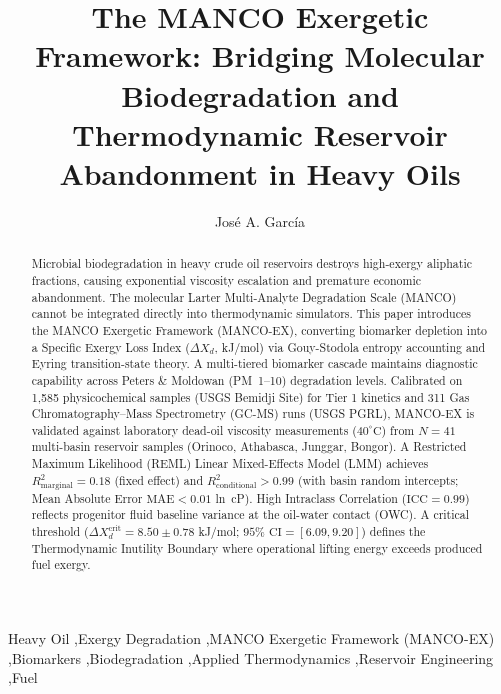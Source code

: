 \documentclass[review,12pt]{elsarticle}
\begin{document}
\begin{frontmatter}

\title{The MANCO Exergetic Framework: Bridging Molecular Biodegradation and Thermodynamic Reservoir Abandonment in Heavy Oils}

\author{José A. García}

\address{Instituto de Ciencias de la Tierra, Universidad Central de Venezuela, AP 3895, Caracas 1010A, Venezuela}

\begin{abstract}
Microbial biodegradation in heavy crude oil reservoirs destroys high-exergy aliphatic fractions, causing exponential viscosity escalation and premature economic abandonment. The molecular Larter Multi-Analyte Degradation Scale (MANCO) cannot be integrated directly into thermodynamic simulators. This paper introduces the MANCO Exergetic Framework (MANCO-EX), converting biomarker depletion into a Specific Exergy Loss Index ($\Delta X_d$, kJ/mol) via Gouy-Stodola entropy accounting and Eyring transition-state theory. A multi-tiered biomarker cascade maintains diagnostic capability across Peters \& Moldowan (PM~1--10) degradation levels. Calibrated on 1,585 physicochemical samples (USGS Bemidji Site) for Tier 1 kinetics and 311 Gas Chromatography--Mass Spectrometry (GC-MS) runs (USGS PGRL), MANCO-EX is validated against laboratory dead-oil viscosity measurements ($40^\circ\text{C}$) from $N = 41$ multi-basin reservoir samples (Orinoco, Athabasca, Junggar, Bongor). A Restricted Maximum Likelihood (REML) Linear Mixed-Effects Model (LMM) achieves $R^2_{\text{marginal}} = 0.18$ (fixed effect) and $R^2_{\text{conditional}} > 0.99$ (with basin random intercepts; Mean Absolute Error $\text{MAE} < 0.01$ ln~cP). High Intraclass Correlation ($\text{ICC} = 0.99$) reflects progenitor fluid baseline variance at the oil-water contact (OWC). A critical threshold ($\Delta X_d^{\text{crit}} = 8.50 \pm 0.78$ kJ/mol; $95\%\text{ CI} = [6.09, 9.20]$) defines the Thermodynamic Inutility Boundary where operational lifting energy exceeds produced fuel exergy.
\end{abstract}

\begin{keyword}
Heavy Oil \sep Exergy Degradation \sep MANCO Exergetic Framework (MANCO-EX) \sep Biomarkers \sep Biodegradation \sep Applied Thermodynamics \sep Reservoir Engineering \sep Fuel
\end{keyword}

\end{frontmatter}
\end{document}
